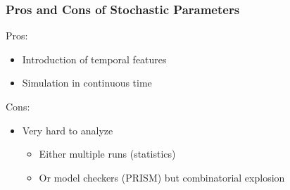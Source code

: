 
\begin{frame}[c]
  \frametitle{Pros and Cons of Stochastic Parameters}

Pros:
\begin{itemize}
  \item Introduction of temporal features
  \item Simulation in continuous time
\end{itemize}

\bigskip
Cons:
\begin{itemize}
  \item Very hard to analyze
    \begin{itemize}
      \item Either multiple runs (statistics)
      \item Or model checkers (PRISM) but combinatorial explosion
    \end{itemize}
\end{itemize}

\end{frame}
